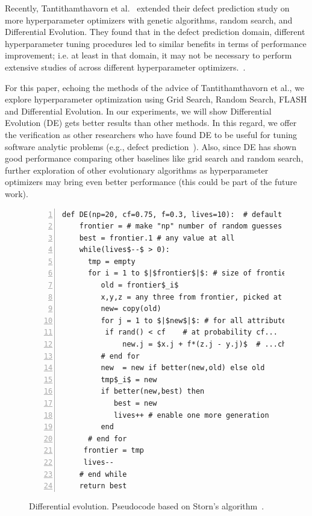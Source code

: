 \documentclass[smallextended]{svjour3}
\newcommand{\respto}[1]{
\fcolorbox{black}{black!15}{%
\label{resp:#1}%
\bf\scriptsize R{#1}}}
\newcommand{\BLUE}{\color{blue}}
\newcommand{\BLACK}{\color{black}}
\begin{document}
\BLACK
Recently, Tantithamthavorn et al.~\cite{tantithamthavorn2018impact}
extended their defect prediction study on more hyperparameter optimizers with 
genetic algorithms, random search, 
and Differential Evolution.
They found that in the defect prediction domain, different hyperparameter tuning procedures led to similar benefits in terms of performance improvement; i.e. at least in that domain, it may not be necessary to perform extensive studies of across different hyperparameter optimizers.~\cite{tantithamthavorn2018impact}.

\BLUE
\respto{2G2} 
For this paper, echoing the methods of the advice of Tantithamthavorn et al., we explore  hyperparameter optimization using Grid Search, Random Search, FLASH and Differential Evolution.
In our experiments, we will show Differential Evolution (DE) gets better results than other methods. In this regard, we offer the verification as other researchers who have found DE to be useful for tuning  software analytic problems (e.g., defect prediction~\cite{fu2016differential,Fu2016TuningFS}). 
Also, since DE has shown good performance comparing other baselines like grid search and random search, further exploration of other evolutionary algorithms as hyperparameter optimizers may bring even better performance
(this could be part of the future work).
\BLACK



\begin{figure}[!b]
\centering
\small 
\begin{center}
\begin{minipage}{4in}\begin{lstlisting}[mathescape,linewidth=7.5cm,frame=none,numbers=left ]
  def DE(np=20, cf=0.75, f=0.3, lives=10):  # default settings
    frontier = # make "np" number of random guesses
    best = frontier.1 # any value at all
    while(lives$--$ > 0): 
      tmp = empty
      for i = 1 to $|$frontier$|$: # size of frontier
         old = frontier$_i$
         x,y,z = any three from frontier, picked at random
         new= copy(old)
         for j = 1 to $|$new$|$: # for all attributes
          if rand() < cf    # at probability cf...
              new.j = $x.j + f*(z.j - y.j)$  # ...change item j
         # end for
         new  = new if better(new,old) else old
         tmp$_i$ = new 
         if better(new,best) then
            best = new
            lives++ # enable one more generation
         end
      # end for
     frontier = tmp
     lives--
    # end while
    return best
\end{lstlisting} 
\end{minipage}
\end{center}
\caption{Differential evolution. Pseudocode based on Storn's algorithm~\cite{storn1997differential}.}
\label{fig:pseudo_DE} 
\vspace{-0.3cm}
\end{figure}
\end{document}
